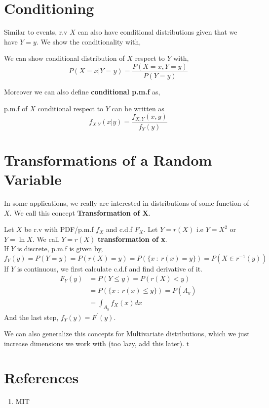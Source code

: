 \section{Conditioning}
Similar to events, r.v $X$ can also have conditional distributions given that we have $Y=y$. We show the conditionality with,
\begin{definition}
    We can show conditional distribution of $X$ respect to $Y$ with,
    \[P(X=x| Y=y) = \frac{ P(X=x,Y=y)}{P(Y=y)} \]
\end{definition}
Moreover we can also define \textbf{conditional p.m.f} as,
\begin{definition}
    p.m.f of $X$ conditional respect to $Y$ can be written as 
    \[ f_{X|Y}(x|y)= \frac{f_{X,Y}(x,y)}{f_Y(y)}\]
\end{definition}
 

\section{Transformations of a Random Variable}
In some applications, we really are interested in distributions of some function of $X$. We call this concept \textbf{Transformation of X}.
\begin{definition}
    Let $X$ be r.v with PDF/p.m.f $f_X$ and c.d.f $F_X$. Let $Y=r(X)$ i.e $Y=X^2$ or $Y = \ln X$. We call $Y=r(X)$ \textbf{transformation of x}. \\
    \newline
    If $Y$ is discrete, p.m.f is given by,
    \[f_Y(y)= P(Y=y) =  P( r(X) = y) = P( \{x \ : \ r(x) = y\})= P( X \in r^{-1}(y)) \]
    \newline
    If $Y$ is continuous, we first calculate c.d.f and find derivative of it. 
    \begin{align*}
        F_Y(y) &= P( Y \le y) = P(r(X) < y) \\
               &= P(\{x \ : \ r(x) \le y \}) = P( A_y)    \\
               &= \int_{A_y} f_X(x)dx
    \end{align*}
    And the last step, $f_Y(y) = F^{'}(y)$.
\end{definition}
We can also generalize this concepts for Multivariate distributions, which we just increase dimensions we work with (too lazy, add this later).
t
\section{References}
\begin{enumerate}
    \item MIT
\end{enumerate}
